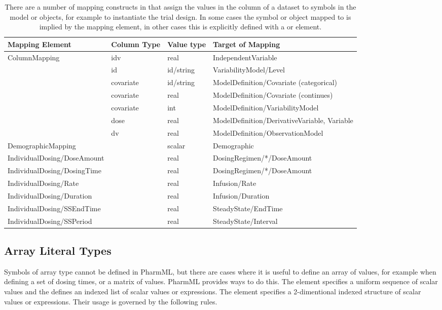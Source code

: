 \begin{table}[ht!]
\begin{center}
\small
\begin{tabular}{llll}\toprule
Mapping Element & Column Type & Value type & Target of Mapping \\\midrule
ColumnMapping & idv & real & IndependentVariable  \\
			& id			& id/string & VariabilityModel/Level \\
			& covariate & id/string &  ModelDefinition/Covariate (categorical) \\	
			& covariate & real &  ModelDefinition/Covariate (continues) \\
			& covariate & int &  ModelDefinition/VariabilityModel \\
			& dose 	& real &  ModelDefinition/DerivativeVariable, Variable \\
			& dv 	& real &  ModelDefinition/ObservationModel \\
DemographicMapping & & scalar & Demographic \\
IndividualDosing/DoseAmount & & real & DosingRegimen/*/DoseAmount \\
IndividualDosing/DosingTime & & real & DosingRegimen/*/DoseAmount \\
IndividualDosing/Rate &  & real & Infusion/Rate \\
IndividualDosing/Duration & & real &Infusion/Duration \\
IndividualDosing/SSEndTime & & real & SteadyState/EndTime \\
IndividualDosing/SSPeriod & & real & SteadyState/Interval \\\bottomrule
\end{tabular}
\end{center}
\caption{There are a number of mapping constructs in \pharmml that assign the
values in the column of a dataset to symbols in the model or objects,
for example to instantiate the trial design. In some cases the symbol
or object mapped to is implied by the mapping element, in other cases
this is explicitly defined with a  or 
element.}
\label{tab:data-set-mapping}
\end{table}%


\subsection{Array Literal Types}
Symbols of array type cannot be defined in PharmML, but there are cases where 
it is useful to define an array of values, for example when defining a set of dosing times, 
or a matrix of values. PharmML provides ways to do this. The  
element specifies a uniform sequence of scalar values and the  defines 
an indexed list of scalar values or expressions. The  element specifies 
a 2-dimentional indexed structure of scalar values or expressions. Their usage is 
governed by the following rules.


